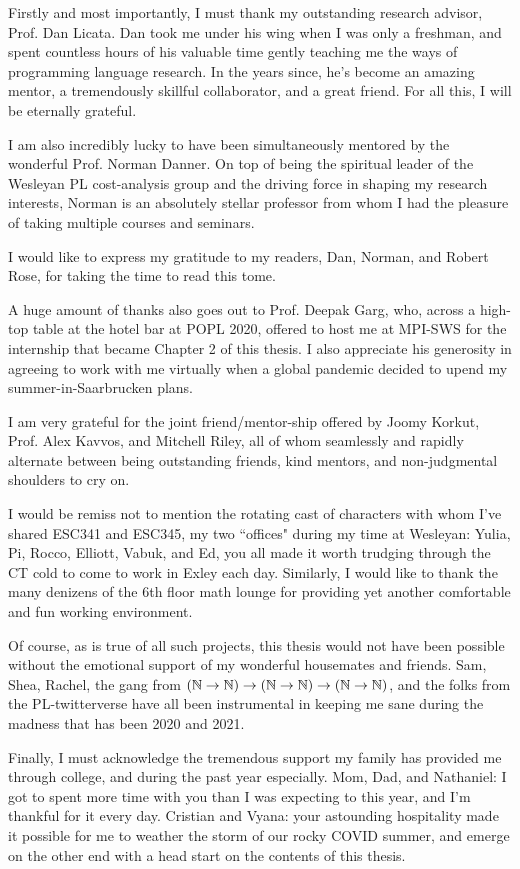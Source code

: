 \documentclass[final]{westhesis}
\begin{document}
\begin{acknowledgements}
Firstly and most importantly, I must thank my outstanding research advisor, Prof. Dan Licata. Dan took me under his wing when I was only a freshman, and spent countless hours of his valuable time gently teaching me the ways of programming language research. In the years since, he's become an amazing mentor, a tremendously skillful collaborator, and a great friend. For all this, I will be eternally grateful.

I am also incredibly lucky to have been simultaneously mentored by the wonderful Prof. Norman Danner. On top of being the spiritual leader of the Wesleyan PL cost-analysis group and the driving force in shaping my research interests, Norman is an absolutely stellar professor from whom I had the pleasure of taking multiple courses and seminars.

I would like to express my gratitude to my readers, Dan, Norman, and Robert Rose, for taking the time to read this tome.

A huge amount of thanks also goes out to Prof. Deepak Garg, who, across a high-top table at the hotel bar at POPL 2020, offered to host me at MPI-SWS for the internship that became Chapter 2 of this thesis. I also appreciate his generosity in agreeing to work with me virtually when a global pandemic decided to upend my summer-in-Saarbrucken plans.

I am very grateful for the joint friend/mentor-ship offered by Joomy Korkut, Prof. Alex Kavvos, and Mitchell Riley, all of whom seamlessly and rapidly alternate between being outstanding friends, kind mentors, and non-judgmental shoulders to cry on.

I would be remiss not to mention the rotating cast of characters with whom I've shared ESC341 and ESC345, my two ``offices" during my time at Wesleyan: Yulia, Pi, Rocco, Elliott, Vabuk, and Ed, you all made it worth trudging through the CT cold to come to work in Exley each day. Similarly, I would like to thank the many denizens of the 6th floor math lounge for providing yet another comfortable and fun working environment.

Of course, as is true of all such projects, this thesis would not have been possible without the emotional support of my wonderful housemates and friends. Sam, Shea, Rachel, the gang from $(\mathbb{N} \to \mathbb{N}) \to (\mathbb{N} \to \mathbb{N}) \to (\mathbb{N} \to \mathbb{N})$, and the folks from the PL-twitterverse have all been instrumental in keeping me sane during the madness that has been 2020 and 2021.

Finally, I must acknowledge the tremendous support my family has provided me through college, and during the past year especially. Mom, Dad, and Nathaniel: I got to spent more time with you than I was expecting to this year, and I'm thankful for it every day. Cristian and Vyana: your astounding hospitality made it possible for me to weather the storm of our rocky COVID summer, and emerge on the other end with a head start on the contents of this thesis.
\end{acknowledgements}
\end{document}

